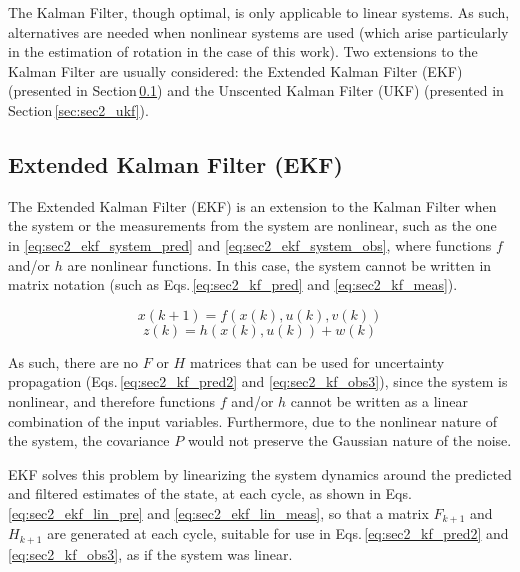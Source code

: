 \documentclass[10pt,twocolumn]{IEEEtran}
\begin{document}
The Kalman Filter, though optimal, is only applicable to linear systems. As such, alternatives are needed when nonlinear systems are used (which arise particularly in the estimation of rotation in the case of this work). Two extensions to the Kalman Filter are usually considered: the Extended Kalman Filter (EKF) (presented in Section\,\ref{sec:sec2_ekf}) and the Unscented Kalman Filter (UKF) (presented in  Section\,\ref{sec:sec2_ukf}).

\subsection{Extended Kalman Filter (EKF)}
\label{sec:sec2_ekf}

The Extended Kalman Filter (EKF) is an extension to the Kalman Filter when the system or the measurements from the system are nonlinear, such as the one in \eqref{eq:sec2_ekf_system_pred} and \eqref{eq:sec2_ekf_system_obs}, where functions $f$ and/or $h$ are nonlinear functions. In this case, the system cannot be written in matrix notation (such as Eqs.\,\eqref{eq:sec2_kf_pred} and \eqref{eq:sec2_kf_meas}).%

\begin{equation}
    \label{eq:sec2_ekf_system_pred}
    x(k+1) = f(x(k),u(k),v(k))
\end{equation}
\begin{equation}
    \label{eq:sec2_ekf_system_obs}
    z(k)=h(x(k), u(k)) + w(k)
\end{equation}

 As such, there are no $F$ or $H$ matrices that can be used for uncertainty propagation (Eqs.\,\eqref{eq:sec2_kf_pred2} and \eqref{eq:sec2_kf_obs3}), since the system is nonlinear, and therefore functions $f$ and/or $h$ cannot be written as a linear combination of the input variables. Furthermore, due to the nonlinear nature of the system, the covariance $P$ would not preserve the Gaussian nature of the noise.

 EKF solves this problem by linearizing the system dynamics around the predicted and filtered estimates of the state, at each cycle, as shown in Eqs.\,\eqref{eq:sec2_ekf_lin_pre} and \eqref{eq:sec2_ekf_lin_meas}, so that a matrix $F_{k+1}$ and $H_{k+1}$ are generated at each cycle, suitable for use in Eqs.\,\eqref{eq:sec2_kf_pred2} and \eqref{eq:sec2_kf_obs3}, as if the system was linear.
\end{document}
